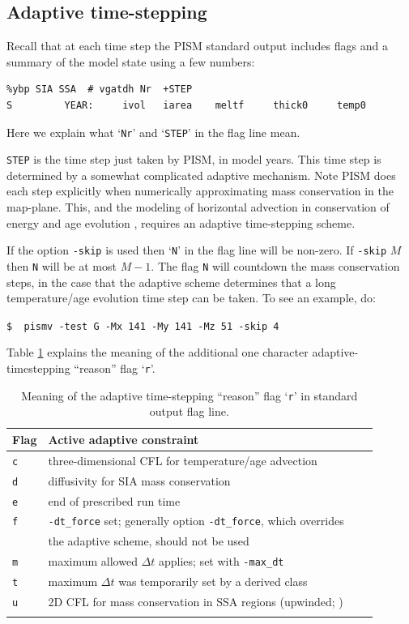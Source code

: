 \documentclass[11pt,final]{amsart}
\begin{document}
\subsection{Adaptive time-stepping} \label{subsect:adapt} Recall that at each time step the PISM standard output includes flags and a summary of the model state using a few numbers:
\begin{verbatim}
%ybp SIA SSA  # vgatdh Nr  +STEP
S         YEAR:     ivol   iarea    meltf     thick0     temp0
\end{verbatim}
Here we explain what `\verb|Nr|' and `\verb|STEP|' in the flag line mean.

\verb|STEP| is the time step just taken by PISM, in model years.  This time step is determined by a somewhat complicated adaptive mechanism.  Note PISM does each step explicitly when numerically approximating mass conservation in the map-plane.  This, and the modeling of horizontal advection in conservation of energy and age evolution \cite{BBL}, requires an adaptive time-stepping scheme.

If the option \verb|-skip| is used then `\verb|N|' in the flag line will be non-zero.  If \verb|-skip| $M$ then \verb|N| will be at most $M-1$.  The flag \verb|N| will countdown the mass conservation steps, in the case that the adaptive scheme determines that a long temperature/age evolution time step can be taken.  To see an example, do:

\verb|$  pismv -test G -Mx 141 -My 141 -Mz 51 -skip 4|

Table \ref{tab:adaptiveflag} explains the meaning of the additional one character adaptive-timestepping ``reason'' flag `\verb|r|'.

\begin{table}[ht]
\caption{Meaning of the adaptive time-stepping ``reason'' flag `\texttt{r}' in standard output flag line.}\label{tab:adaptiveflag}
\begin{tabular}{@{}llll}\hline
\textbf{Flag} & \textbf{Active adaptive constraint} \\ \hline
\verb|c| & three-dimensional CFL for temperature/age advection \cite{BBL} \\
\verb|d| & diffusivity for SIA mass conservation \cite{BBL} \\
\verb|e| & end of prescribed run time \\
\verb|f| & \verb|-dt_force| set; generally option \verb|-dt_force|, which overrides \\
 & the adaptive scheme, should not be used  \\
\verb|m| & maximum allowed $\Delta t$ applies; set with \verb|-max_dt| \\
\verb|t| & maximum $\Delta t$ was temporarily set by a derived class \\
\verb|u| & 2D CFL for mass conservation in SSA regions (upwinded; \cite{BBssasliding})\\
\hline
\normalsize
\end{tabular}
\end{table}
\end{document}
